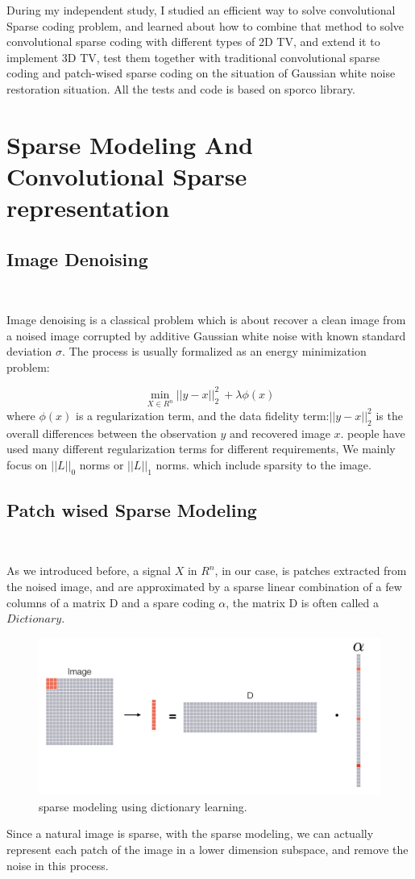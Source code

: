 \documentclass[a4paper,11pt]{article}
\begin{document}
During my independent study, I studied an efficient way to solve convolutional Sparse coding problem, and learned about how to combine that method to solve convolutional sparse coding with different types of 2D TV, and extend it to implement 3D TV, test them together with traditional convolutional sparse coding and patch-wised sparse coding on the situation of Gaussian white noise restoration situation. All the tests and code is based on sporco\cite{sporco} library.


\section{Sparse Modeling And Convolutional Sparse representation}


\subsection{Image Denoising}~

Image denoising is a classical problem which is about recover a clean image from a noised image corrupted by additive Gaussian white noise with known standard deviation $\sigma$. The process is usually formalized as an energy minimization problem:

$$\mathop{\min}_{X \in R^n} ||y-x||_2^2 \  + \lambda\phi(x) $$
where $\phi(x)$ is a regularization term, and the data fidelity term:$||y-x||_2^2 $ is the overall differences between the observation $y$ and recovered image $x$. 
people have used many different regularization terms for different requirements, We mainly focus on  $||L||_0$ norms or $||L||_1$ norms.  which include sparsity to the image.

\subsection{Patch wised Sparse Modeling}~

As we introduced before, a signal $X$ in $R^n$, in our case, is patches extracted from the noised image, and  are approximated by a sparse linear combination of a few columns of  a matrix D and a spare coding $\alpha$, the matrix D is often called a $Dictionary$.
\begin{figure}[H]
  \includegraphics[width=\linewidth]{DL.png}
  \caption{sparse modeling using dictionary learning.}
\end{figure}
 Since a natural image is sparse, with the sparse modeling, we can actually represent each patch of the image in a lower dimension subspace, and remove the noise in this process.
 
\end{document}
